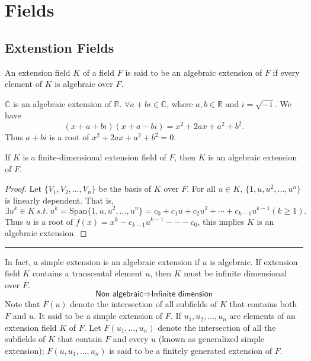 \chapter{Fields}

\section{Extenstion Fields}

\begin{definition}
    An extension field $K$ of a field $F$ is said to be an algebraic extension of $F$ if every element 
    of $K$ is algebraic over $F$.
\end{definition}

\begin{example}
    $\mathbb{C}$ is an algebraic extension of $\mathbb{R}$. $\forall a+bi \in \mathbb{C}$, where 
    $a,b \in \mathbb{R}$ and $i = \sqrt{-1}$. We have 
    \[
        (x+a+bi)(x+a-bi) = x^2 +2ax + a^2 + b^2.
    \]
    Thus $a+bi$ is a root of $x^2 +2ax + a^2 + b^2 = 0$.
\end{example}

\begin{theorem}
    If $K$ is a finite-dimensional extension field of $F$, then $K$ is an algebraic extension of $F$.
\end{theorem}
\begin{proof}
    Let $\{ V_1, V_2, \ldots, V_n \}$ be the basis of $K$ over $F$. For all $u \in K$, 
    $\{ 1, u, u^2, \ldots, u^n \}$ is linearly dependent. That is, 
    \[
        \exists u^k \in K \> s.t. \> u^k = \text{Span} \{1, u, u^2, \ldots, u^n\} = c_0 + c_1 u + c_2 u^2 +
        \cdots + c_{k-1} u^{k-1} (k \geq 1).
    \]
    Thus $u$ is a root of $f(x) = x^k - c_{k-1} u^{k-1} - \cdots - c_0$, this implies $K$ is an algebraic extension.
\end{proof}

\hrule
\vspace{10pt}

In fact, a simple extension is an algebraic extension if $u$ is algebraic. If extension field $K$ contains a 
transcental element $u$, then $K$ must be infinite dimensional over $F$.
\[
    \textsf{Non algebraic} \Longrightarrow \textsf{Infinite dimension}
\]
Note that $F(u)$ denote the intersection of all subfields of $K$ that contains both $F$ and $u$. It said to be a simple 
extension of $F$. If $u_1, u_2, \ldots, u_n$ are elements of an extension field $K$ of $F$. Let 
$F(u_1, \ldots, u_n)$ denote the intersection of all the subfields of $K$ that contain $F$ and every $u$ (known as 
generalized simple extension); $F(u, u_1, \ldots, u_n)$ is said to be a finitely generated extension of $F$.

